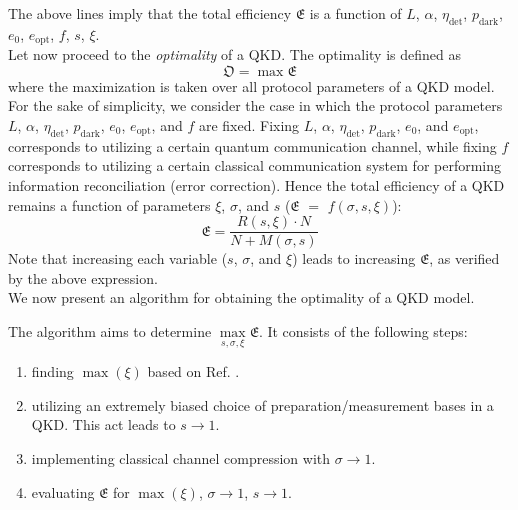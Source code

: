 \documentclass[journal,onecolumn]{IEEEtran}
\theoremstyle{thmstyleone}%
\theoremstyle{thmstyletwo}%
\theoremstyle{thmstylethree}%
\begin{document}
	
	The above lines imply that the total efficiency $\mathfrak{E}$ is a function of $L$, $\alpha$, $\eta_{\text{det}}$, $p_{\text{dark}}$, $e_0$, $e_{\text{opt}}$, $f$, $s$, $\xi$. \\
	\indent Let now proceed to the \textit{optimality} of a QKD. The optimality is defined as
	\begin{equation}\label{opt-expr}
		\mathfrak{O} = \max \mathfrak{E}
	\end{equation}
	where the maximization is taken over all protocol parameters of a QKD model. For the sake of simplicity, we consider the case in which the protocol parameters $L$, $\alpha$, $\eta_{\text{det}}$, $p_{\text{dark}}$, $e_0$, $e_{\text{opt}}$, and $f$ are fixed. Fixing $L$, $\alpha$, $\eta_{\text{det}}$, $p_{\text{dark}}$, $e_0$, and $e_{\text{opt}}$, corresponds to utilizing a certain quantum communication channel, while fixing $f$ corresponds to utilizing a certain classical communication system for performing information reconciliation (error correction). Hence the total efficiency of a QKD remains a function of parameters $\xi$, $\sigma$, and $s$ ($\mathfrak{E}$ $=$ $f(\sigma,s,\xi)$):
	\begin{equation}
		\mathfrak{E} = \frac{R(s,\xi)\cdot N}{N + M(\sigma,s)}
	\end{equation}
	Note that increasing each variable ($s$, $\sigma$, and $\xi$) leads to increasing $\mathfrak{E}$, as verified by the above expression.\\
	\indent We now present an algorithm for obtaining the optimality of a QKD model.
	\begin{tcolorbox}[colback=magenta!5,colframe=magenta!40!black,title=\textsc{Algorithm (Method)---Determining optimality}]
		The algorithm aims to determine $\max\limits_{s,\sigma,\xi} \mathfrak{E}$. It consists of the following steps:
		\begin{enumerate}
			\item finding $\max(\xi)$ based on Ref. \cite{Bebrov2024}.
			\item utilizing an extremely biased choice of preparation/measurement bases in a QKD. This act leads to $s\rightarrow1$.
			\item implementing classical channel compression with $\sigma\rightarrow1$.
			\item evaluating $\mathfrak{E}$ for $\max(\xi)$, $\sigma\rightarrow1$, $s\rightarrow1$. 
		\end{enumerate}
	\end{tcolorbox}
	
\end{document}

